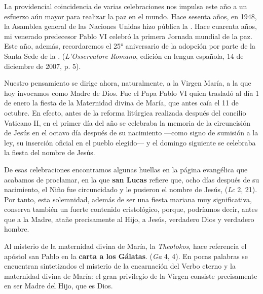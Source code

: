 \begin{body}
	La providencial coincidencia de varias celebraciones nos impulsa este año a un esfuerzo aún mayor para realizar la paz en el mundo. Hace sesenta años, en 1948, la Asamblea general de las Naciones Unidas hizo pública la . Hace cuarenta años, mi venerado predecesor Pablo VI celebró la primera Jornada mundial de la paz. Este año, además, recordaremos el 25° aniversario de la adopción por parte de la Santa Sede de la .  (\emph{L'Osservatore Romano}, edición en lengua española, 14 de diciembre de 2007, p. 5).
	
	Nuestro pensamiento se dirige ahora, naturalmente, a la Virgen María, a la que hoy invocamos como Madre de Dios. Fue el Papa Pablo VI quien trasladó al día 1 de enero la fiesta de la Maternidad divina de María, que antes caía el 11 de octubre. En efecto, antes de la reforma litúrgica realizada después del concilio Vaticano II, en el primer día del año se celebraba la memoria de la circuncisión de Jesús en el octavo día después de su nacimiento ---como signo de sumisión a la ley, su inserción oficial en el pueblo elegido--- y el domingo siguiente se celebraba la fiesta del nombre de Jesús.
	
	De esas celebraciones encontramos algunas huellas en la página evangélica que acabamos de proclamar, en la que \textbf{san Lucas} refiere que, ocho días después de su nacimiento, el Niño fue circuncidado y le pusieron el nombre de Jesús,  (\emph{Lc} 2, 21). Por tanto, esta solemnidad, además de ser una fiesta mariana muy significativa, conserva también un fuerte contenido cristológico, porque, podríamos decir, antes que a la Madre, atañe precisamente al Hijo, a Jesús, verdadero Dios y verdadero hombre.
	
	Al misterio de la maternidad divina de María, la \emph{Theotokos}, hace referencia el apóstol san Pablo en la \textbf{carta a los Gálatas}.  (\emph{Ga} 4, 4). En pocas palabras se encuentran sintetizados el misterio de la encarnación del Verbo eterno y la maternidad divina de María: el gran privilegio de la Virgen consiste precisamente en ser Madre del Hijo, que es Dios.
	

\end{body}
